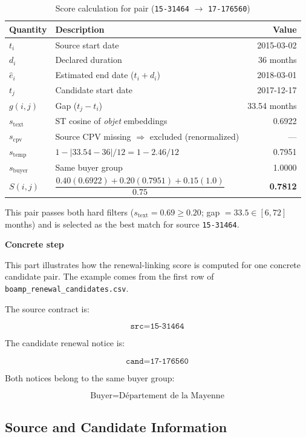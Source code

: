 \documentclass[12pt, a4paper]{article}
\begin{document}
\begin{table}[h]
\centering
\caption{Score calculation for pair (\texttt{15-31464} $\to$ \texttt{17-176560})}
\label{tab:example}
\begin{tabular}{llr}
\toprule
Quantity & Description & Value \\
\midrule
$t_i$           & Source start date          & 2015-03-02 \\
$d_i$           & Declared duration          & 36 months \\
$\hat{e}_i$     & Estimated end date ($t_i + d_i$) & 2018-03-01 \\
$t_j$           & Candidate start date       & 2017-12-17 \\
$g(i,j)$        & Gap ($t_j - t_i$)          & 33.54 months \\
\midrule
$s_{\text{text}}$ & ST cosine of \textit{objet} embeddings & 0.6922 \\
$s_{\text{cpv}}$  & Source CPV missing $\Rightarrow$ excluded (renormalized) & --- \\
$s_{\text{temp}}$ & $1 - |33.54 - 36| / 12 = 1 - 2.46/12$ & 0.7951 \\
$s_{\text{buyer}}$& Same buyer group           & 1.0000 \\
\midrule
$S(i,j)$        & $\dfrac{0.40(0.6922) + 0.20(0.7951) + 0.15(1.0)}{0.75}$ & \textbf{0.7812} \\
\bottomrule
\end{tabular}
\end{table}

\noindent This pair passes both hard filters ($s_{\text{text}} = 0.69 \geq 0.20$;
gap $= 33.5 \in [6, 72]$ months) and is selected as the best match for source
\texttt{15-31464}.

\textbf{Concrete step}

This part illustrates how the renewal-linking score is computed for one
concrete candidate pair. The example comes from the first row of
\texttt{boamp\_renewal\_candidates.csv}.

The source contract is:

\[
\texttt{src} = \texttt{15-31464}
\]

The candidate renewal notice is:

\[
\texttt{cand} = \texttt{17-176560}
\]

Both notices belong to the same buyer group:

\[
\text{Buyer} = \text{D\'epartement de la Mayenne}
\]

\subsection*{Source and Candidate Information}
\end{document}
